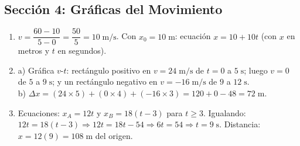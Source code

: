 \documentclass[12pt, letterpaper]{article}
\begin{document}
  \newpage

  \subsection*{Sección 4: Gráficas del Movimiento}

  \begin{enumerate}[leftmargin=*, label=\textbf{\arabic*.}]
    \item $v = \dfrac{60 - 10}{5 - 0} = \dfrac{50}{5} = 10\;\text{m/s}$.
          Con $x_0 = 10\;\text{m}$: ecuación $x = 10 + 10t$ (con $x$ en metros y $t$ en segundos).

    \item a) Gráfica $v$-$t$: rectángulo positivo en $v = 24\;\text{m/s}$ de $t = 0$ a $5\;\text{s}$; luego $v = 0$ de $5$ a $9\;\text{s}$; y un rectángulo negativo en $v = -16\;\text{m/s}$ de $9$ a $12\;\text{s}$.
          \\[2pt]
          b) $\Delta x = (24 \times 5) + (0 \times 4) + (-16 \times 3) = 120 + 0 - 48 = 72\;\text{m}$.

    \item Ecuaciones: $x_A = 12t$ y $x_B = 18(t - 3)$ para $t \geq 3$.
          Igualando: $12t = 18(t - 3) \Rightarrow 12t = 18t - 54 \Rightarrow 6t = 54 \Rightarrow t = 9\;\text{s}$.
          Distancia: $x = 12(9) = 108\;\text{m}$ del origen.
  \end{enumerate}

\fi
\end{document}
